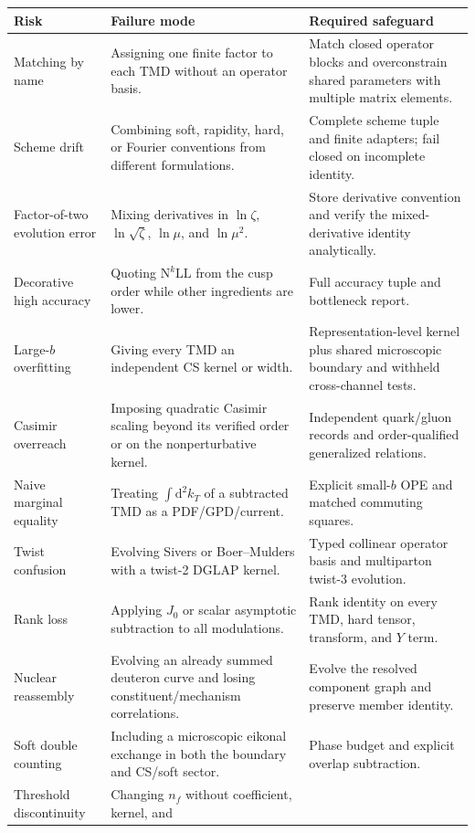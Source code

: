 \documentclass[11pt]{article}
\newcommand{\dd}{\mathrm{d}}
\begin{document}
\begin{longtable}{L{0.22\textwidth}L{0.34\textwidth}L{0.36\textwidth}}
\toprule
Risk & Failure mode & Required safeguard\\
\midrule
\endhead
Matching by name & Assigning one finite factor to each TMD without an operator
basis. & Match closed operator blocks and overconstrain shared parameters with
multiple matrix elements.\\
Scheme drift & Combining soft, rapidity, hard, or Fourier conventions from
different formulations. & Complete scheme tuple and finite adapters; fail
closed on incomplete identity.\\
Factor-of-two evolution error & Mixing derivatives in \(\ln\zeta\),
\(\ln\sqrt\zeta\), \(\ln\mu\), and \(\ln\mu^2\). & Store derivative convention
and verify the mixed-derivative identity analytically.\\
Decorative high accuracy & Quoting \(\mathrm{N}^k\mathrm{LL}\) from the cusp
order while other ingredients are lower. & Full accuracy tuple and bottleneck
report.\\
Large-\(b\) overfitting & Giving every TMD an independent CS kernel or width. &
Representation-level kernel plus shared microscopic boundary and withheld
cross-channel tests.\\
Casimir overreach & Imposing quadratic Casimir scaling beyond its verified
order or on the nonperturbative kernel. & Independent quark/gluon records and
order-qualified generalized relations.\\
Naive marginal equality & Treating \(\int\dd^2k_T\) of a subtracted TMD as a
PDF/GPD/current. & Explicit small-\(b\) OPE and matched commuting squares.\\
Twist confusion & Evolving Sivers or Boer--Mulders with a twist-2 DGLAP kernel.
& Typed collinear operator basis and multiparton twist-3 evolution.\\
Rank loss & Applying \(J_0\) or scalar asymptotic subtraction to all
modulations. & Rank identity on every TMD, hard tensor, transform, and \(Y\)
term.\\
Nuclear reassembly & Evolving an already summed deuteron curve and losing
constituent/mechanism correlations. & Evolve the resolved component graph and
preserve member identity.\\
Soft double counting & Including a microscopic eikonal exchange in both the
boundary and CS/soft sector. & Phase budget and explicit overlap subtraction.\\
Threshold discontinuity & Changing \(n_f\) without coefficient, kernel, and

\end{longtable}
\end{document}
